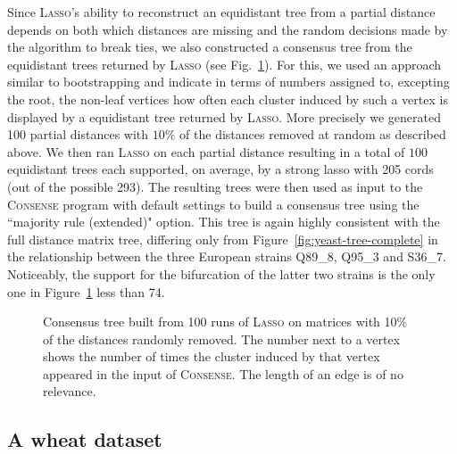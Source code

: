 Since \textsc{Lasso}'s ability to reconstruct an equidistant tree from a
partial distance depends on both which distances are missing and the random
decisions made by the algorithm to break ties, we also constructed a consensus
tree from the equidistant trees returned by \textsc{Lasso} (see
Fig.~\ref{fig:yeast-tree-consense}).  For this, we used an approach similar to
bootstrapping and indicate in terms of numbers assigned to, excepting the
root, the non-leaf vertices how often each cluster induced by such a vertex is
displayed by a equidistant tree returned by \textsc{Lasso}.  More precisely we
generated 100 partial distances with $10\%$ of the distances removed at random
as described above.  We then ran \textsc{Lasso} on each partial distance
resulting in a total of $100$ equidistant trees each supported, on average, by
a strong lasso with 205 cords (out of the possible 293).  The resulting trees
were then used as input to the \textsc{Consense} program
\cite{felsenstein1993phylip} with default settings to build a consensus tree
using the ``majority rule (extended)" option. This tree is again highly
consistent with the full distance matrix tree, differing only from
Figure~\ref{fig:yeast-tree-complete} in the relationship between the three
European strains Q89\_8, Q95\_3 and S36\_7. Noticeably, the support for the
bifurcation of the latter two strains is the only one in
Figure~\ref{fig:yeast-tree-consense} less than 74.

\begin{figure}
  \centering
  \begin{tikzpicture}[xscale=0.8,yscale=0.35]
    
  \end{tikzpicture}
  \endpgfgraphicnamed
  \caption{Consensus tree built from 100 runs of \textsc{Lasso} on matrices
    with 10\% of the distances randomly removed.  The number next to a vertex
    shows the number of times the cluster induced by that vertex appeared in
    the input of \textsc{Consense}. The length of an edge is of no relevance.}
  \label{fig:yeast-tree-consense}
\end{figure}

\subsection{A wheat dataset}

